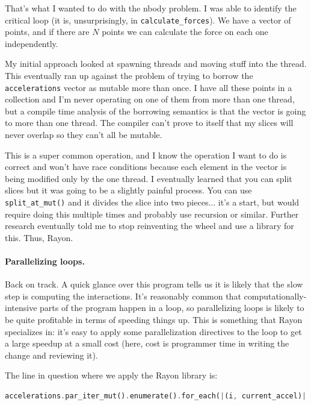 \documentclass[a4paper]{report}
\begin{document}
\begin{appendices}
That's what I wanted to do with the nbody problem. I was able to identify the critical loop (it is, unsurprisingly, in \texttt{calculate\_forces}). We have a vector of points, and if there are $N$ points we can calculate the force on each one independently. 

My initial approach looked at spawning threads and moving stuff into the thread. This eventually ran up against the problem of trying to borrow the \texttt{accelerations} vector as mutable more than once. I have all these points in a collection and I'm never operating on one of them from more than one thread, but a compile time analysis of the borrowing semantics is that the vector is going to more than one thread. The compiler can't prove to itself that my slices will never overlap so they can't all be mutable.

 This is a super common operation, and I know the operation I want to do is correct and won't have race conditions because each element in the vector is being modified only by the one thread. I eventually learned that you can split slices but it was going to be a slightly painful process. You can use \texttt{split\_at\_mut()} and it divides the slice into two pieces... it's a start, but would require doing this multiple times and probably use recursion or similar. Further research eventually told me to stop reinventing the wheel and use a library for this. Thus, Rayon.

\paragraph{Parallelizing loops.} Back on track. A quick glance over this program tells us it is likely that the slow step is computing the interactions. It's reasonably common that computationally-intensive parts of the program happen in a loop, so parallelizing loops is likely to be quite profitable in terms of speeding things up. This is something that Rayon specializes in: it's easy to apply some parallelization directives to the loop to get a large speedup at a small cost (here, cost is programmer time in writing the change and reviewing it).

The line in question where we apply the Rayon library is:
\begin{lstlisting}[language=Rust]
accelerations.par_iter_mut().enumerate().for_each(|(i, current_accel)| {
\end{lstlisting}


\end{appendices}
\end{document}
